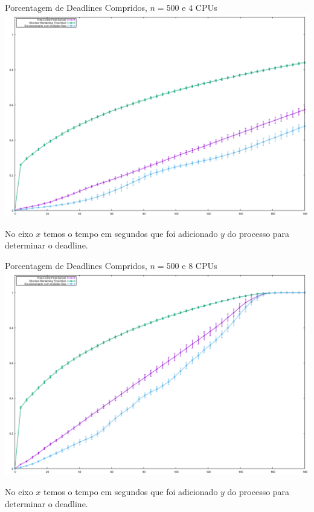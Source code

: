 \documentclass{beamer}
\begin{document}
\begin{frame}{Porcentagem de Deadlines Compridos, $n = 500$ e $4$ CPUs}
	\includegraphics[width=\textwidth]{graphs/testes_capella/result/deadlines-r4-500}
	
	{\tiny No eixo $x$ temos o tempo em segundos que foi adicionado $y$ do processo para determinar o deadline.}
\end{frame}


\begin{frame}{Porcentagem de Deadlines Compridos, $n = 500$ e $8$ CPUs}
	\includegraphics[width=\textwidth]{graphs/testes_capella/result/deadlines-r8-500}
	
	{\tiny No eixo $x$ temos o tempo em segundos que foi adicionado $y$ do processo para determinar o deadline.}
\end{frame}
\end{document}
